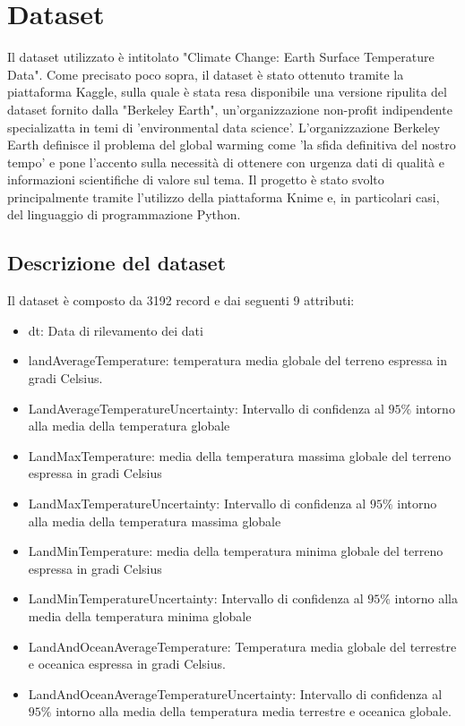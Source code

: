 \documentclass[10pt, a4paper, twocolumn]{article} %
\begin{document}

\section{Dataset}

Il dataset utilizzato è intitolato "Climate Change: Earth Surface Temperature Data".%
Come precisato poco sopra, il dataset è stato ottenuto tramite la piattaforma Kaggle, sulla quale è stata resa disponibile una versione ripulita del dataset fornito dalla "Berkeley Earth", un'organizzazione non-profit indipendente specializatta in temi di 'environmental data science'.
L'organizzazione Berkeley Earth definisce il problema del global warming come 'la sfida definitiva del nostro tempo' e pone l'accento sulla necessità di ottenere con urgenza dati di qualità e informazioni scientifiche di valore sul tema.
Il progetto è stato svolto principalmente tramite l'utilizzo della piattaforma Knime e, in particolari casi, del linguaggio di programmazione Python.

\subsection{Descrizione del dataset}
Il dataset è composto da 3192 record e dai seguenti 9 attributi:
\begin{itemize}
	\item dt: Data di rilevamento dei dati
	\item landAverageTemperature: temperatura media globale del terreno espressa in gradi Celsius.
	\item LandAverageTemperatureUncertainty: Intervallo di confidenza al $95 \%$ intorno alla media della temperatura globale
	\item LandMaxTemperature: media della temperatura massima globale del terreno espressa in gradi Celsius
	\item LandMaxTemperatureUncertainty:  Intervallo di confidenza al $95 \%$ intorno alla media della temperatura massima globale
	\item LandMinTemperature: media della temperatura minima globale del terreno espressa in gradi Celsius
	\item LandMinTemperatureUncertainty: Intervallo di confidenza al $95 \%$ intorno alla media della temperatura minima globale
	\item LandAndOceanAverageTemperature: Temperatura media globale del terrestre e oceanica espressa in gradi Celsius.
	\item LandAndOceanAverageTemperatureUncertainty: Intervallo di confidenza al $95 \%$ intorno alla media della temperatura media terrestre e oceanica globale.
\end{itemize}
\end{document}
